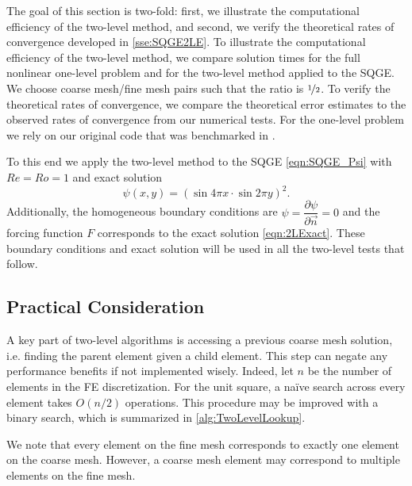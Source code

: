 The goal of this section is two-fold: first, we illustrate the computational
efficiency of the two-level method, and second, we verify the theoretical rates
of convergence developed in \autoref{sse:SQGE2LE}.  To illustrate the
computational efficiency of the two-level method, we compare solution times for
the full nonlinear one-level problem and for the two-level method applied to the
SQGE. We choose coarse mesh/fine mesh pairs such that the ratio is
$\nicefrac{1}{2}$. To verify the theoretical rates of convergence, we compare
the theoretical error estimates to the observed rates of convergence from our
numerical tests. For the one-level problem we rely on our original code that was
benchmarked in \cite{Foster}.

To this end we apply the two-level method to the SQGE \eqref{eqn:SQGE_Psi}
with $Re=Ro=1$ and exact solution
\begin{equation}
  \psi(x,y) = \left(\sin 4\pi x \cdot \sin 2\pi y\right)^2.
  \label{eqn:2LExact}
\end{equation}
Additionally, the homogeneous boundary conditions are $\psi=\dfrac{\partial
\psi}{\partial \vec{n}}=0$ and the forcing function $F$ corresponds to the exact
solution \eqref{eqn:2LExact}. These boundary conditions and exact solution will
be used in all the two-level tests that follow.

\subsection{Practical Consideration}
A key part of two-level algorithms is accessing a previous coarse mesh solution,
i.e. finding the parent element given a child element. This step can negate any
performance benefits if not implemented wisely. Indeed, let $ n $ be the number
of elements in the FE discretization. For the unit square, a na\"{i}ve search
across every element takes $ O(n/2) $ operations. This procedure may be improved
with a binary search, which is summarized in \autoref{alg:TwoLevelLookup}.

We note that every element on the fine mesh corresponds to exactly one element
on the coarse mesh. However, a coarse mesh element may correspond to multiple
elements on the fine mesh.

